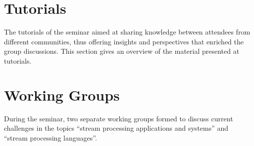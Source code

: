 \documentclass[preprint]{sig-alternate-10pt}
\begin{document}

\section{Tutorials}
The tutorials of the seminar aimed at sharing knowledge between
attendees from different communities, thus offering insights and
perspectives that enriched the group discussions. This section gives
an overview of the material presented at tutorials.




\section{Working Groups}
During the seminar, two separate working groups formed to discuss
current challenges in the topics ``stream processing applications and systems''
and ``stream processing languages''.






\vspace*{-2mm}
\balance

\end{document}
